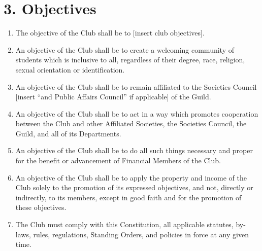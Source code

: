 \documentclass[12pt]{article}
\begin{document}
\section{3. Objectives}
\begin{enumerate}[label=3.\arabic*]
\item The objective of the Club shall be to [insert club objectives].
\item An objective of the Club shall be to create a welcoming community of students which is inclusive to all, regardless of their degree, race, religion, sexual orientation or identification.
\item An objective of the Club shall be to remain affiliated to the Societies Council [insert
“and Public Affairs Council” if applicable] of the Guild.
\item An objective of the Club shall be to act in a way which promotes cooperation between the Club and other Affiliated Societies, the Societies Council, the Guild, and all of its Departments.
\item An objective of the Club shall be to do all such things necessary and proper for the benefit or advancement of Financial Members of the Club.
\item An objective of the Club shall be to apply the property and income of the Club solely to the promotion of its expressed objectives, and not, directly or indirectly, to its members, except in good faith and for the promotion of these objectives.
\item The Club must comply with this Constitution, all applicable statutes, by-laws, rules, regulations, Standing Orders, and policies in force at any given time.
\end{enumerate}
\end{document}
